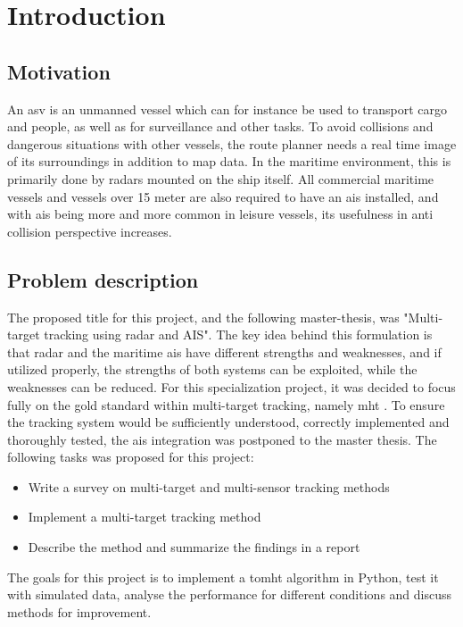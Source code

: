 \section{Introduction}
\subsection{Motivation}
An \gls{asv} is an unmanned vessel which can for instance be used to transport cargo and people, as well as for surveillance and other tasks. To avoid collisions and dangerous situations with other vessels, the route planner needs a real time image of its surroundings in addition to map data. In the maritime environment, this is primarily done by \glspl{radar} mounted on the ship itself. All commercial maritime vessels and vessels over 15 meter are also required to have an \gls{ais} installed, and with \gls{ais} being more and more common in leisure vessels, its usefulness in anti collision perspective increases.

\subsection{Problem description}
The proposed title for this project, and the following master-thesis, was "Multi-target tracking using \gls{radar} and AIS". The key idea behind this formulation is that \gls{radar} and the maritime \gls{ais} have different strengths and weaknesses, and if utilized properly, the strengths of both systems can be exploited, while the weaknesses can be reduced. For this specialization project, it was decided to focus fully on the gold standard within multi-target tracking, namely \gls{mht} . To ensure the tracking system would be sufficiently understood, correctly implemented and thoroughly tested, the \gls{ais} integration was postponed to the master thesis. The following tasks was proposed for this project:

\begin{itemize}
\item Write a survey on multi-target and multi-sensor tracking methods
\item Implement a multi-target tracking method
\item Describe the method and summarize the findings in a report
\end{itemize}

The goals for this project is to implement a \gls{tomht} algorithm in Python, test it with simulated data, analyse the performance for different conditions and discuss methods for improvement.


